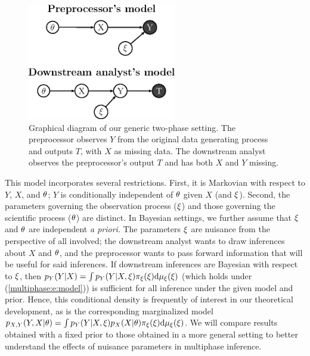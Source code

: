 \begin{figure}
\centering
\includegraphics[height=2in]{figures/multiphase/diagram_model_vertical}
\caption{Graphical diagram of our  generic two-phase setting. The preprocessor  observes $Y$ from the original data generating process and outputs $T$, with $X$ as missing data. The downstream analyst observes the preprocessor's output $T$ and has both $X$ and $Y$ missing.\label{multiphase:fig:models}}
\end{figure}

This model incorporates several restrictions.
First, it is Markovian with respect to $Y$, $X$, and $\theta$; $Y$ is conditionally independent of $\theta$ given $X$ (and $\xi$).
Second, the parameters governing the observation process ($\xi$) and those governing the scientific process  ($\theta$) are distinct.
In Bayesian settings, we further assume that $\xi$ and $\theta$ are independent \textit{a priori}.
The parameters $\xi$ are nuisance from the perspective of all involved; the downstream analyst wants to draw inferences about $X$ and $\theta$, and the preprocessor wants to pass forward information that will be useful for said inferences.
If downstream inferences are Bayesian with respect to $\xi$, then $p_Y(Y|X) = \int p_Y(Y | X, \xi) \pi_\xi(\xi)\mathrm{d}\mu_{\xi}(\xi)$ (which holds under (\ref{multiphase:e:model})) is sufficient for all inference under the given model and prior.
Hence, this conditional density is frequently of interest in our theoretical development, as is the corresponding marginalized model $p_{X,Y}(Y, X | \theta) = \int p_Y(Y | X, \xi)  p_X(X | \theta) \pi_\xi(\xi)\mathrm{d} \mu_{\xi}(\xi)$.
We will compare results obtained with a fixed prior to those obtained in a more general setting to better understand the effects of nuisance parameters in multiphase inference.

